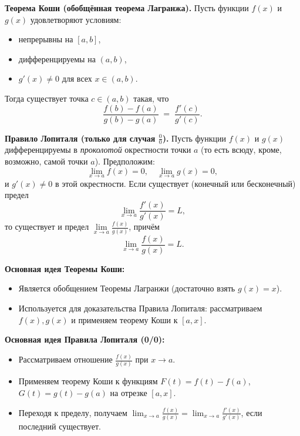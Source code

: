 

\textbf{Теорема Коши (обобщённая теорема Лагранжа).}
Пусть функции $f(x)$ и $g(x)$ удовлетворяют условиям:
\begin{itemize}
  \item непрерывны на $[a,b]$,
  \item дифференцируемы на $(a,b)$,
  \item $g'(x)\neq 0$ для всех $x\in(a,b)$.
\end{itemize}
Тогда существует точка $c\in(a,b)$ такая, что
\[
\frac{f(b)-f(a)}{g(b)-g(a)} \;=\; \frac{f'(c)}{g'(c)}.
\]

\medskip

\textbf{Правило Лопиталя (только для случая \(\tfrac{0}{0}\)).}
Пусть функции $f(x)$ и $g(x)$ дифференцируемы в \emph{проколотой} окрестности точки $a$ (то есть всюду, кроме, возможно, самой точки $a$). Предположим:
\[
\lim_{x\to a} f(x) = 0, \quad \lim_{x\to a} g(x)=0,
\]
и $g'(x)\neq 0$ в этой окрестности. Если существует (конечный или бесконечный) предел
\[
\lim_{x\to a} \frac{f'(x)}{g'(x)} = L,
\]
то существует и предел \(\lim\limits_{x\to a}\frac{f(x)}{g(x)}\), причём
\[
\lim_{x\to a}\frac{f(x)}{g(x)} = L.
\]

\medskip


\textbf{Основная идея Теоремы Коши:}
\begin{itemize}
  \item Является обобщением Теоремы Лагранжи (достаточно взять $g(x)=x$).  
  \item Используется для доказательства Правила Лопиталя: рассматриваем $f(x), g(x)$ и применяем теорему Коши к $[a,x]$.
\end{itemize}

\textbf{Основная идея Правила Лопиталя (0/0):}
\begin{itemize}
  \item Рассматриваем отношение $\frac{f(x)}{g(x)}$ при $x\to a$.  
  \item Применяем теорему Коши к функциям $F(t)=f(t)-f(a)$, $G(t)=g(t)-g(a)$ на отрезке $[a,x]$.  
  \item Переходя к пределу, получаем $\lim_{x\to a}\frac{f(x)}{g(x)}=\lim_{x\to a}\frac{f'(x)}{g'(x)}$, если последний существует.
\end{itemize}

